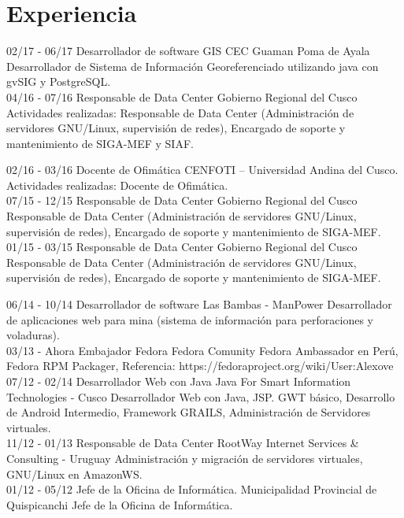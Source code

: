 \documentclass[]{friggeri-cv}
\begin{document}
\section{Experiencia}
\begin{entrylist}
    \entry
    {02/17 - 06/17}
    {Desarrollador de software GIS}
    {CEC Guaman Poma de Ayala}
    {Desarrollador de Sistema de Informaci\'on Georeferenciado utilizando java con gvSIG y PostgreSQL.\\}
    \entry
    {04/16 - 07/16}
    {Responsable de Data Center}
    {Gobierno Regional del Cusco}
    {Actividades realizadas: Responsable de Data Center (Administraci\'on de servidores GNU/Linux, supervisi\'on
    de redes), Encargado de soporte y mantenimiento de SIGA-MEF y SIAF.\\}
\end{entrylist}
\begin{entrylist}
    \entry
    {02/16 - 03/16}
    {Docente de Ofim\'atica}
    {CENFOTI – Universidad Andina del Cusco.}
    {Actividades realizadas: Docente de Ofim\'atica.\\}
    \entry
    {07/15 - 12/15}
    {Responsable de Data Center}
    {Gobierno Regional del Cusco}
    {Responsable de Data Center (Administraci\'on de servidores GNU/Linux, supervisi\'on de redes), Encargado de
    soporte y mantenimiento de SIGA-MEF.\\}
    \entry
    {01/15 - 03/15}
    {Responsable de Data Center}
    {Gobierno Regional del Cusco}
    {Responsable de Data Center (Administraci\'on de servidores GNU/Linux, supervisi\'on de redes), Encargado de
    soporte y mantenimiento de SIGA-MEF.\\}

    \entry
    {06/14 - 10/14}
    {Desarrollador de software}
    {Las Bambas - ManPower}
    {Desarrollador de aplicaciones web para mina (sistema de informaci\'on para perforaciones y voladuras).\\}
    \entry
    {03/13 - Ahora}
    {Embajador Fedora}
    {Fedora Comunity}
    {Fedora Ambassador en Per\'u, Fedora RPM Packager, Referencia{:} https{:}//fedoraproject.org/wiki/User{:}Alexove\\}
    \entry
    {07/12 - 02/14}
    {Desarrollador Web con Java}
    {Java For Smart Information Technologies - Cusco}
    {Desarrollador Web con Java, JSP. GWT b\'asico, Desarrollo de Android Intermedio, Framework GRAILS, Administraci\'on de Servidores virtuales.\\}
    \entry
    {11/12 - 01/13}
    {Responsable de Data Center}
    {{RootWay Internet Services \& Consulting - Uruguay}}
    {{Administraci\'on y migraci\'on de servidores virtuales, GNU/Linux en AmazonWS. \\ }}
    \entry
    {01/12 - 05/12}
    {Jefe de la Oficina de Inform\'atica.}
    {Municipalidad Provincial de Quispicanchi}
    {Jefe de la Oficina de Inform\'atica.\\}
\end{entrylist}
\end{document}
